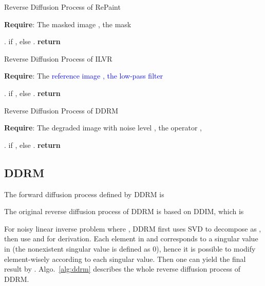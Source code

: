 \documentclass{article} \usepackage{iclr2023_conference,times}
\begin{document}
\begin{algorithm}\caption{Reverse Diffusion Process of RePaint}
\label{alg:repaint}
\textbf{Require}: The masked image , the mask 
\begin{algorithmic}[1] \State .
\For{}
\For{}
\State  if , else .
\State \textcolor{blue}{}
\label{alg:repaint yt}
\State 
\State 
\label{alg:repaint rnd}
\State 
\label{alg:repaint loop}
\EndIf
\EndFor
\EndFor
\State \textbf{return} 
\end{algorithmic}
\end{algorithm}



\begin{algorithm}\caption{Reverse Diffusion Process of ILVR}
\label{alg:ilvr}
\textbf{Require}: The \textcolor{blue}{reference image , the low-pass filter }
\begin{algorithmic}[1] \State .
\For{}
\State  if , else .
\State 
\label{alg:ilvr xt}
\State 
\State 
\label{alg:ilvr rnd}
\EndFor
\State \textbf{return} 
\end{algorithmic}
\end{algorithm}



\newpage


\begin{algorithm}\caption{Reverse Diffusion Process of DDRM}
\label{alg:ddrm}
\textbf{Require}: The degraded image  with noise level , the operator , 
\begin{algorithmic}[1] \State .
\State \textcolor{blue}{}
\For{}
\State  if , else .
\State 
\For{}
\If{}
\label{alg:ddrm seq0}
\State 
\label{alg:ddrm null}
\ElsIf{}
\State 
\ElsIf{}
\label{alg:ddrm sneq0}
\State 
\label{alg:ddrm range}
\EndIf
\EndFor
\State 
\EndFor
\State \textbf{return} 
\end{algorithmic}
\end{algorithm}



\subsection{DDRM} The forward diffusion process defined by DDRM is

The original reverse diffusion process of DDRM is based on DDIM, which is

For noisy linear inverse problem  where , DDRM first uses SVD to decompose  as , then use  and  for derivation. Each element in  and  corresponds to a singular value in (the nonexistent singular value is defined as 0), hence it is possible to modify  element-wisely according to each singular value. Then one can yield the final result  by . Algo.~\ref{alg:ddrm} describes the whole reverse diffusion process of DDRM. 
\end{document}
